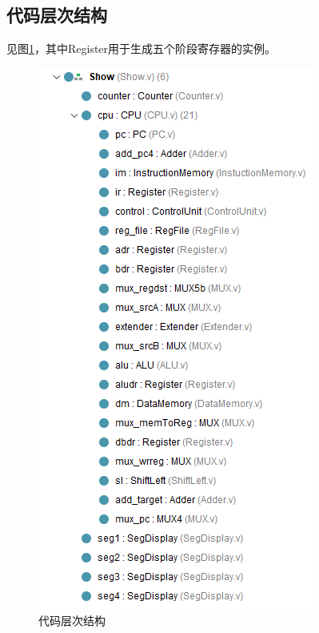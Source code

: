 \subsection{代码层次结构}
\qquad 见图\ref{fig:code_hierachy}，其中Register用于生成五个阶段寄存器的实例。
\begin{figure}[H]
\centering
\includegraphics[width=0.4\linewidth]{fig/code_hierarchy.PNG}
\caption{代码层次结构}
\label{fig:code_hierachy}
\end{figure}